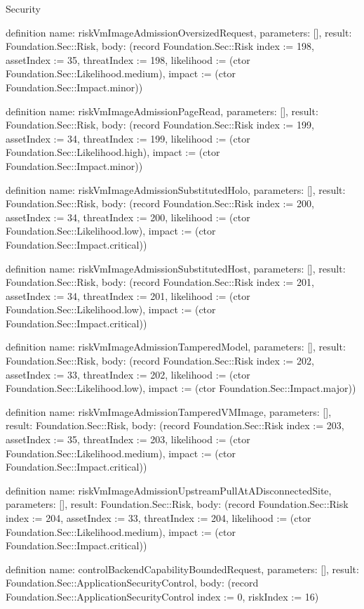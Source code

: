 \begin{lexlean}{Security}
\begin{semanticmodule}
definition{
  name: riskVmImageAdmissionOversizedRequest,
  parameters: [],
  result: Foundation.Sec::Risk,
  body: (record Foundation.Sec::Risk {index := 198, assetIndex := 35, threatIndex := 198, likelihood := (ctor Foundation.Sec::Likelihood.medium), impact := (ctor Foundation.Sec::Impact.minor)})
}

definition{
  name: riskVmImageAdmissionPageRead,
  parameters: [],
  result: Foundation.Sec::Risk,
  body: (record Foundation.Sec::Risk {index := 199, assetIndex := 34, threatIndex := 199, likelihood := (ctor Foundation.Sec::Likelihood.high), impact := (ctor Foundation.Sec::Impact.minor)})
}

definition{
  name: riskVmImageAdmissionSubstitutedHolo,
  parameters: [],
  result: Foundation.Sec::Risk,
  body: (record Foundation.Sec::Risk {index := 200, assetIndex := 34, threatIndex := 200, likelihood := (ctor Foundation.Sec::Likelihood.low), impact := (ctor Foundation.Sec::Impact.critical)})
}

definition{
  name: riskVmImageAdmissionSubstitutedHost,
  parameters: [],
  result: Foundation.Sec::Risk,
  body: (record Foundation.Sec::Risk {index := 201, assetIndex := 34, threatIndex := 201, likelihood := (ctor Foundation.Sec::Likelihood.low), impact := (ctor Foundation.Sec::Impact.critical)})
}

definition{
  name: riskVmImageAdmissionTamperedModel,
  parameters: [],
  result: Foundation.Sec::Risk,
  body: (record Foundation.Sec::Risk {index := 202, assetIndex := 33, threatIndex := 202, likelihood := (ctor Foundation.Sec::Likelihood.low), impact := (ctor Foundation.Sec::Impact.major)})
}

definition{
  name: riskVmImageAdmissionTamperedVMImage,
  parameters: [],
  result: Foundation.Sec::Risk,
  body: (record Foundation.Sec::Risk {index := 203, assetIndex := 35, threatIndex := 203, likelihood := (ctor Foundation.Sec::Likelihood.medium), impact := (ctor Foundation.Sec::Impact.critical)})
}

definition{
  name: riskVmImageAdmissionUpstreamPullAtADisconnectedSite,
  parameters: [],
  result: Foundation.Sec::Risk,
  body: (record Foundation.Sec::Risk {index := 204, assetIndex := 33, threatIndex := 204, likelihood := (ctor Foundation.Sec::Likelihood.medium), impact := (ctor Foundation.Sec::Impact.critical)})
}

definition{
  name: controlBackendCapabilityBoundedRequest,
  parameters: [],
  result: Foundation.Sec::ApplicationSecurityControl,
  body: (record Foundation.Sec::ApplicationSecurityControl {index := 0, riskIndex := 16})
}


\end{semanticmodule}
\end{lexlean}
